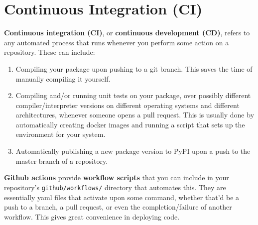 \documentclass{article}
\begin{document}
\section{Continuous Integration (CI)} 

  \textbf{Continuous integration (CI)}, or \textbf{continuous development (CD)}, refers to any automated process that runs whenever you perform some action on a repository. These can include: 
  \begin{enumerate}
    \item Compiling your package upon pushing to a git branch. This saves the time of manually compiling it yourself. 
    \item Compiling and/or running unit tests on your package, over possibly different compiler/interpreter versions on different operating systems and different architectures, whenever someone opens a pull request. This is usually done by automatically creating docker images and running a script that sets up the environment for your system. 
    \item Automatically publishing a new package version to PyPI upon a push to the master branch of a repository. 
  \end{enumerate} 

  \textbf{Github actions} provide \textbf{workflow scripts} that you can include in your repository's \texttt{github/workflows/} directory that automates this. They are essentially yaml files that activate upon some command, whether that'd be a push to a branch, a pull request, or even the completion/failure of another workflow. This gives great convenience in deploying code. 

  

\section{}
\end{document}
